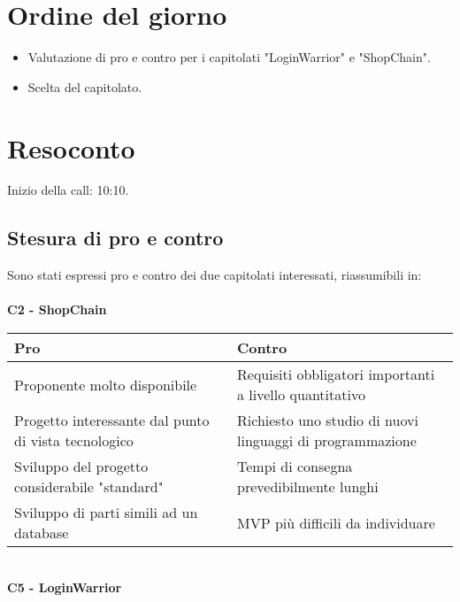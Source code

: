 \section{Ordine del giorno}

\begin{itemize}
	\item Valutazione di pro e contro per i capitolati "LoginWarrior" e "ShopChain".
	\item Scelta del capitolato.
\end{itemize}

\section{Resoconto}
Inizio della call: 10:10.
\subsection{Stesura di pro e contro}
 Sono stati espressi pro e contro dei due capitolati interessati, riassumibili in:\\ \\
 \textbf{C2 - ShopChain} \\
\begin{tabular}{|p{0.50\linewidth}|p{0.50 \linewidth}|}
	\hline
	\textbf{Pro} & \textbf{Contro}                                                                                                                                                                                                                                                                                        \\
	\hline
	Proponente molto disponibile & Requisiti obbligatori importanti a livello quantitativo\\
	\hline
	Progetto interessante dal punto di vista tecnologico & Richiesto uno studio di nuovi linguaggi di programmazione \\
	\hline
	Sviluppo del progetto considerabile "standard" & Tempi di consegna prevedibilmente lunghi\\
	\hline
	Sviluppo di parti simili ad un database& MVP più difficili da individuare \\
	\hline
\end{tabular}
\medskip
\\\noindent
\textbf{C5 - LoginWarrior} \\
